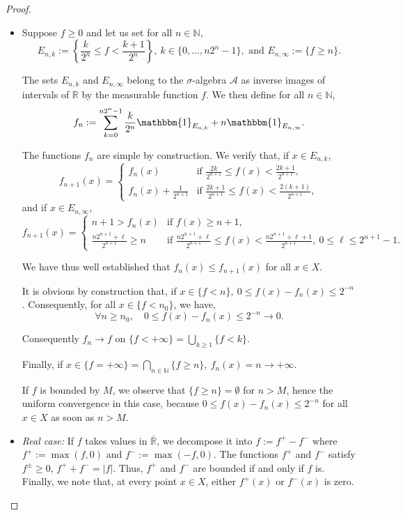 \documentclass[12pt]{article}
\theoremstyle{definition}
\begin{document}
\begin{proof}
\begin{itemize}
\item[(a)] Suppose $f \geq 0$ and let us set for all $n \in \mathbb{N}$,
$$ E_{n,k} := \left\{ \frac{k}{2^n} \leq f < \frac{k+1}{2^n} \right\}, \ k \in \{0, \dots, n2^n - 1\}, \text{ and } E_{n,\infty} := \{f \geq n\}. $$

The sets $E_{n,k}$ and $E_{n,\infty}$ belong to the $\sigma$-algebra $\mathscr{A}$ as inverse images of intervals of $\mathbb{R}$ by the measurable function $f$. We then define for all $n \in \mathbb{N}$,
$$ f_n := \sum_{k=0}^{n2^n - 1} \frac{k}{2^n} \mathbbm{1}_{E_{n,k}} + n \mathbbm{1}_{E_{n,\infty}}. $$

The functions $f_n$ are simple by construction. We verify that, if $x \in E_{n,k}$,
$$ f_{n+1}(x) = 
\begin{cases} 
f_n(x) & \text{if } \frac{2k}{2^{n+1}} \leq f(x) < \frac{2k+1}{2^{n+1}}, \\
f_n(x) + \frac{1}{2^{n+1}} & \text{if } \frac{2k+1}{2^{n+1}} \leq f(x) < \frac{2(k+1)}{2^{n+1}},
\end{cases} $$
and if $x \in E_{n,\infty}$,
$$ f_{n+1}(x) = 
\begin{cases} 
n + 1 > f_n(x) & \text{if } f(x) \geq n + 1, \\
\frac{n2^{n+1} + \ell}{2^{n+1}} \geq n & \text{if } \frac{n2^{n+1} + \ell}{2^{n+1}} \leq f(x) < \frac{n2^{n+1} + \ell + 1}{2^{n+1}}, \ 0 \leq \ell \leq 2^{n+1} - 1.
\end{cases} $$

We have thus well established that $f_n(x) \leq f_{n+1}(x)$ for all $x \in X$.

It is obvious by construction that, if $x \in \{f < n\}, \ 0 \leq f(x) - f_n(x) \leq 2^{-n}$. Consequently, for all $x \in \{f < n_0\}$, we have,
$$ \forall n \geq n_0, \quad 0 \leq f(x) - f_n(x) \leq 2^{-n} \to 0. $$

Consequently $f_n \to f$ on $\{f < +\infty\} = \bigcup_{k \geq 1} \{f < k\}$.

Finally, if $x \in \{f = +\infty\} = \bigcap_{n \in \mathbb{N}} \{f \geq n\}, \ f_n(x) = n \to +\infty$.

If $f$ is bounded by $M$, we observe that $\{f \geq n\} = \emptyset$ for $n > M$, hence the uniform convergence in this case, because $0 \leq f(x) - f_n(x) \leq 2^{-n}$ for all $x \in X$ as soon as $n > M$.

\item[(b)] \textit{Real case:} If $f$ takes values in $\overline{\mathbb{R}}$, we decompose it into $f := f^+ - f^-$ where $f^+ := \max(f, 0)$ and $f^- := \max(-f, 0)$. The functions $f^+$ and $f^-$ satisfy $f^\pm \geq 0$, $f^+ + f^- = |f|$. Thus, $f^+$ and $f^-$ are bounded if and only if $f$ is. Finally, we note that, at every point $x \in X$, either $f^+(x)$ or $f^-(x)$ is zero.


\end{itemize}
\end{proof}
\end{document}
